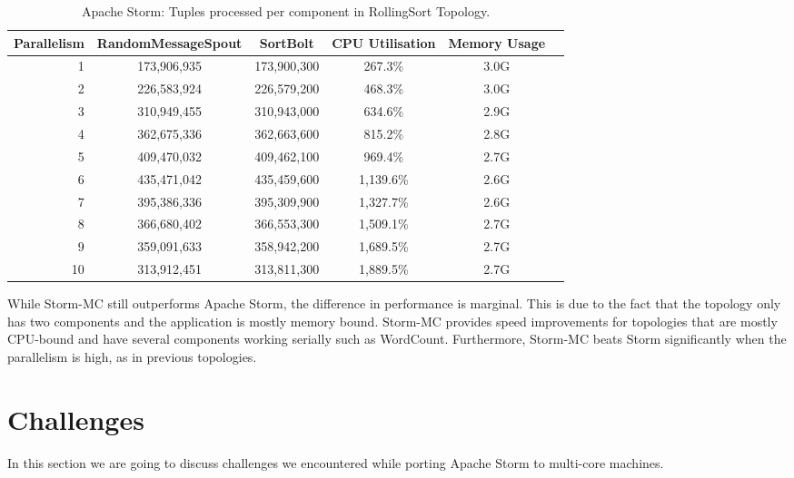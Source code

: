\begin{table}[!htb]
\begin{adjustwidth}{-0.5in}{-0.5in}
\centering
\small
\begin{tabular}{@{}rccccl@{}}
    {Parallelism} & {RandomMessageSpout} & {SortBolt} & {CPU Utilisation} & {Memory Usage} \\ \toprule
    1 & {173,906,935} & {173,900,300} & {267.3\%} & {3.0G} \\
    2 & {226,583,924} & {226,579,200} & {468.3\%} & {3.0G} \\
    3 & {310,949,455} & {310,943,000} & {634.6\%} & {2.9G} \\
    4 & {362,675,336} & {362,663,600} & {815.2\%} & {2.8G} \\
    5 & {409,470,032} & {409,462,100} & {969.4\%} & {2.7G} \\
    6 & {435,471,042} & {435,459,600} & {1,139.6\%} & {2.6G} \\
    7 & {395,386,336} & {395,309,900} & {1,327.7\%} & {2.6G} \\
    8 & {366,680,402} & {366,553,300} & {1,509.1\%} & {2.7G} \\
    9 & {359,091,633} & {358,942,200} & {1,689.5\%} & {2.7G} \\
    10 & {313,912,451} & {313,811,300} & {1,889.5\%} & {2.7G} \\
\end{tabular}
\caption{Apache Storm: Tuples processed per component in RollingSort Topology.}
\label{table:storm_rolling}
\end{adjustwidth}
\end{table}

While Storm-MC still outperforms Apache Storm, the difference in performance is marginal. This is due to the fact that the topology only has two components and the application is mostly memory bound. Storm-MC provides speed improvements for topologies that are mostly CPU-bound and have several components working serially such as WordCount. Furthermore, Storm-MC beats Storm significantly when the parallelism is high, as in previous topologies.

\section{Challenges}
\label{sec:challenges}

In this section we are going to discuss challenges we encountered while porting Apache Storm to multi-core machines.


